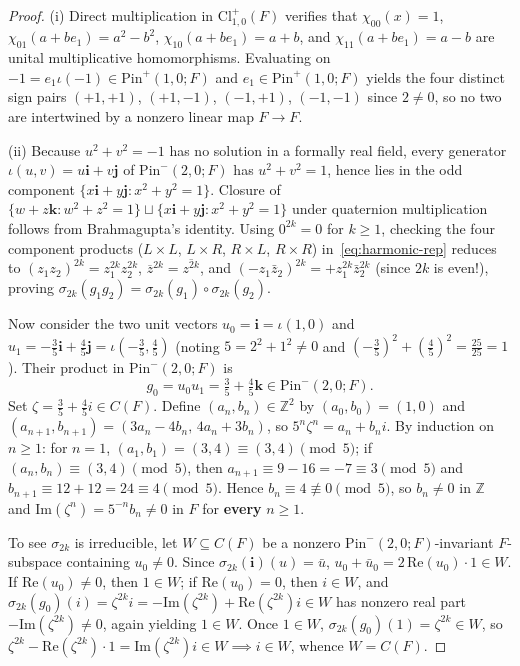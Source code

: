 \documentclass[11pt,a4paper]{article}
\theoremstyle{plain}
\theoremstyle{definition}
\newcommand{\Cl}{\mathrm{Cl}}
\newcommand{\Pin}{\mathrm{Pin}}
\newcommand{\Z}{\mathbb{Z}}
\begin{document}
\begin{proof}
(i) Direct multiplication in $\Cl_{1,0}^+(F)$ verifies that $\chi_{00}(x)=1$, $\chi_{01}(a+be_1)=a^2-b^2$, $\chi_{10}(a+be_1)=a+b$, and $\chi_{11}(a+be_1)=a-b$ are unital multiplicative homomorphisms. Evaluating on $-1 = e_1\iota(-1) \in \Pin^+(1,0;F)$ and $e_1 \in \Pin^+(1,0;F)$ yields the four distinct sign pairs $(+1,+1)$, $(+1,-1)$, $(-1,+1)$, $(-1,-1)$ since $2 \neq 0$, so no two are intertwined by a nonzero linear map $F \to F$.

(ii) Because $u^2 + v^2 = -1$ has no solution in a formally real field, every generator $\iota(u,v) = u\mathbf{i} + v\mathbf{j}$ of $\Pin^-(2,0;F)$ has $u^2 + v^2 = 1$, hence lies in the odd component $\{x\mathbf{i} + y\mathbf{j} : x^2 + y^2 = 1\}$. Closure of $\{w + z\mathbf{k} : w^2+z^2=1\} \sqcup \{x\mathbf{i} + y\mathbf{j} : x^2+y^2=1\}$ under quaternion multiplication follows from Brahmagupta's identity. Using $0^{2k} = 0$ for $k \ge 1$, checking the four component products ($L\times L$, $L\times R$, $R\times L$, $R\times R$) in~\eqref{eq:harmonic-rep} reduces to $(z_1 z_2)^{2k} = z_1^{2k} z_2^{2k}$, $\overline{z}^{2k} = \overline{z^{2k}}$, and $(-z_1\bar{z}_2)^{2k} = +z_1^{2k}\bar{z}_2^{2k}$ (since $2k$ is even!), proving $\sigma_{2k}(g_1 g_2) = \sigma_{2k}(g_1)\circ \sigma_{2k}(g_2)$.

Now consider the two unit vectors $u_0 = \mathbf{i} = \iota(1,0)$ and $u_1 = -\tfrac{3}{5}\mathbf{i} + \tfrac{4}{5}\mathbf{j} = \iota(-\tfrac{3}{5}, \tfrac{4}{5})$ (noting $5 = 2^2 + 1^2 \neq 0$ and $(-\tfrac{3}{5})^2 + (\tfrac{4}{5})^2 = \tfrac{25}{25} = 1$). Their product in $\Pin^-(2,0; F)$ is
\[
  g_0 = u_0 u_1 = \tfrac{3}{5} + \tfrac{4}{5}\mathbf{k} \in \Pin^-(2,0; F).
\]
Set $\zeta = \tfrac{3}{5} + \tfrac{4}{5}i \in C(F)$. Define $(a_n, b_n) \in \Z^2$ by $(a_0,b_0)=(1,0)$ and $(a_{n+1},b_{n+1})=(3a_n - 4b_n,\, 4a_n + 3b_n)$, so $5^n \zeta^n = a_n + b_n i$. By induction on $n \ge 1$: for $n=1$, $(a_1,b_1)=(3,4) \equiv (3,4) \pmod 5$; if $(a_n, b_n) \equiv (3,4) \pmod 5$, then $a_{n+1} \equiv 9 - 16 = -7 \equiv 3 \pmod 5$ and $b_{n+1} \equiv 12 + 12 = 24 \equiv 4 \pmod 5$. Hence $b_n \equiv 4 \not\equiv 0 \pmod 5$, so $b_n \neq 0$ in $\Z$ and $\mathrm{Im}(\zeta^n) = 5^{-n} b_n \neq 0$ in $F$ for \textbf{every} $n \ge 1$.

To see $\sigma_{2k}$ is irreducible, let $W \subseteq C(F)$ be a nonzero $\Pin^-(2,0;F)$-invariant $F$-subspace containing $u_0 \neq 0$. Since $\sigma_{2k}(\mathbf{i})(u) = \bar{u}$, $u_0 + \bar{u}_0 = 2\,\mathrm{Re}(u_0)\cdot 1 \in W$. If $\mathrm{Re}(u_0) \neq 0$, then $1 \in W$; if $\mathrm{Re}(u_0) = 0$, then $i \in W$, and $\sigma_{2k}(g_0)(i) = \zeta^{2k} i = -\mathrm{Im}(\zeta^{2k}) + \mathrm{Re}(\zeta^{2k})i \in W$ has nonzero real part $-\mathrm{Im}(\zeta^{2k}) \neq 0$, again yielding $1 \in W$. Once $1 \in W$, $\sigma_{2k}(g_0)(1) = \zeta^{2k} \in W$, so $\zeta^{2k} - \mathrm{Re}(\zeta^{2k})\cdot 1 = \mathrm{Im}(\zeta^{2k}) i \in W \implies i \in W$, whence $W = C(F)$.


\end{proof}
\end{document}
